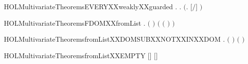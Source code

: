 \begin{SaveVerbatim}{HOLMultivariateTheoremsEVERYXXweaklyXXguarded}
\HOLTokenTurnstile{} \HOLSymConst{\HOLTokenForall{}} .
          \HOLSymConst{\HOLTokenImp{}}
       \HOLSymConst{\HOLTokenForall{}} .    \HOLSymConst{\HOLTokenConj{}}    \HOLSymConst{\HOLTokenImp{}}  \ensuremath{(}\HOLTokenLambda{}. \ensuremath{[}\ensuremath{/}\ensuremath{]} \ensuremath{)}
\end{SaveVerbatim}
\newcommand{\HOLMultivariateTheoremsEVERYXXweaklyXXguarded}{\UseVerbatim{HOLMultivariateTheoremsEVERYXXweaklyXXguarded}}
\begin{SaveVerbatim}{HOLMultivariateTheoremsFDOMXXfromList}
\HOLTokenTurnstile{} \HOLSymConst{\HOLTokenForall{}} .
       \ensuremath{(}  \HOLSymConst{\ensuremath{=}}  \ensuremath{)} \HOLSymConst{\HOLTokenImp{}}
       \ensuremath{(} \ensuremath{(}  \ensuremath{)} \HOLSymConst{\ensuremath{=}}  \ensuremath{)}
\end{SaveVerbatim}
\newcommand{\HOLMultivariateTheoremsFDOMXXfromList}{\UseVerbatim{HOLMultivariateTheoremsFDOMXXfromList}}
\begin{SaveVerbatim}{HOLMultivariateTheoremsfromListXXDOMSUBXXNOTXXINXXDOM}
\HOLTokenTurnstile{} \HOLSymConst{\HOLTokenForall{}}  .
       \HOLSymConst{\HOLTokenNeg{}}   \HOLSymConst{\HOLTokenConj{}} \ensuremath{(}  \HOLSymConst{\ensuremath{=}}  \ensuremath{)} \HOLSymConst{\HOLTokenImp{}}
       \ensuremath{(}   \HOLSymConst{\ensuremath{\setminus}}  \HOLSymConst{\ensuremath{=}}   \ensuremath{)}
\end{SaveVerbatim}
\newcommand{\HOLMultivariateTheoremsfromListXXDOMSUBXXNOTXXINXXDOM}{\UseVerbatim{HOLMultivariateTheoremsfromListXXDOMSUBXXNOTXXINXXDOM}}
\begin{SaveVerbatim}{HOLMultivariateTheoremsfromListXXEMPTY}
\HOLTokenTurnstile{}  \ensuremath{[}\ensuremath{]} \ensuremath{[}\ensuremath{]} \HOLSymConst{\ensuremath{=}} 
\end{SaveVerbatim}
